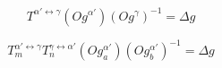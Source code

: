 $$T^{\alpha'\leftrightarrow\gamma}\left(Og^{\alpha'}\right)\left(Og^{\gamma}\right)^{-1} = \Delta g \label{eq:1}$$

$$T_{m}^{\alpha'\leftrightarrow\gamma}T_{n}^{\gamma\leftrightarrow\alpha'}\left(Og_{a}^{\alpha'}\right)\left(Og_{b}^{\alpha'}\right)^{-1} = \Delta g \label{eq:2}$$
